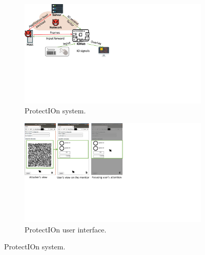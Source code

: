 \documentclass[letterpaper,twocolumn,10pt]{article}
\newcommand{\protection}{\textsf{ProtectIOn}\xspace}
\begin{document}
\begin{figure}[t]
    \begin{center}
        \begin{subfigure}{0.4\textwidth}
        \centering
            \includegraphics[trim={0 8.5cm 17cm 0}, clip, width=\linewidth]{approachOverview.pdf}
             \caption{\protection system.}
            \label{fig:architecture}    
        \end{subfigure}
    \end{center}
    
    
    \begin{center}
        \begin{subfigure}{0.5\textwidth}
        \centering
       \includegraphics[trim={0 8cm 15cm 0}, clip, width=0.9\linewidth]{overlayScreenShot_new.pdf}
    	\caption{\protection user interface.} 
        \label{fig:screenshot}
    \end{subfigure}
    \end{center}
    
    \vspace{-10pt}
    \caption{\protection system.} 
    \label{fig:protection}
\end{figure}
\end{document}
